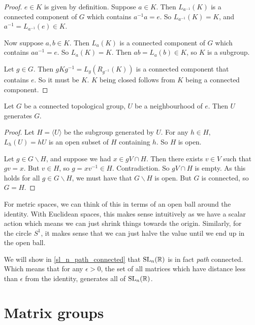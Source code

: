 \documentclass{article}
\begin{document}
    \begin{proof}
        $e \in K$ is given by definition. Suppose $a \in K$. Then $L_{a^{-1}}(K)$ is a connected component of $G$ which contains $a^{-1}a = e$. So $L_{a^{-1}}(K) = K$, and $a^{-1} = L_{a^{-1}}(e) \in K$.
        
        Now suppose $a, b \in K$. Then $L_a(K)$ is a connected component of $G$ which contains $aa^{-1} = e$. So $L_a(K) = K$. Then $ab = L_a(b) \in K$, so $K$ is a subgroup.

        Let $g \in G$. Then $gKg^{-1} = L_g(R_{g^{-1}}(K))$ is a connected component that contains $e$. So it must be $K$. $K$ being closed follows from $K$ being a connected component.
    \end{proof}

    \begin{proposition}
        Let $G$ be a connected topological group, $U$ be a neighbourhood of $e$. Then $U$ generates $G$.
    \end{proposition}

    \begin{proof}
        Let $H = \langle U \rangle$ be the subgroup generated by $U$. For any $h \in H$, $L_h(U) = hU$ is an open subset of $H$ containing $h$. So $H$ is open.

        Let $g \in G \backslash H$, and suppose we had $x \in gV \cap H$. Then there exists $v \in V$ such that $gv = x$. But $v \in H$, so $g = xv^{-1} \in H$. Contradiction. So $gV \cap H$ is empty. As this holds for all $g \in G \backslash H$, we must have that $G \backslash H$ is open. But $G$ is connected, so $G = H$. 
    \end{proof}

    \begin{remark}
        For metric spaces, we can think of this in terms of an open ball around the identity. With Euclidean spaces, this makes sense intuitively as we have a scalar action which means we can just shrink things towards the origin. Similarly, for the circle $S^1$, it makes sense that we can just halve the value until we end up in the open ball.

        We will show in \cref{sl_n_path_connected} that $\operatorname{SL}_n(\mathbb{R})$ is in fact \textit{path} connected. Which means that for any $\epsilon > 0$, the set of all matrices which have distance less than $\epsilon$ from the identity, generates all of $\operatorname{SL}_n(\mathbb{R})$.
    \end{remark}

    \section{Matrix groups}
\end{document}
